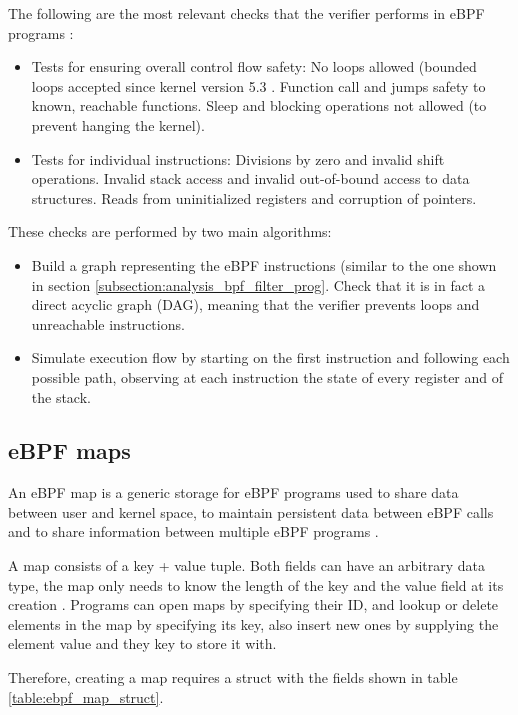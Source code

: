 The following are the most relevant checks that the verifier performs in eBPF programs \cite{ebpf_verifier_kerneldocs} \cite{ebpf_JIT_demystify_page17-22}:
\begin{itemize}
\item Tests for ensuring overall control flow safety:
	\subitem No loops allowed (bounded loops accepted since kernel version 5.3 \cite{ebpf_bounded_loops}.
	\subitem Function call and jumps safety to known, reachable functions.
	\subitem Sleep and blocking operations not allowed (to prevent hanging the kernel).
\item Tests for individual instructions:
	 \subitem Divisions by zero and invalid shift operations.
	 \subitem Invalid stack access and invalid out-of-bound access to data structures.
	 \subitem Reads from uninitialized registers and corruption of pointers.
\end{itemize}

These checks are performed by two main algorithms:
\begin{itemize}
\item Build a graph representing the eBPF instructions (similar to the one shown in section \ref{subsection:analysis_bpf_filter_prog}. Check that it is in fact a direct acyclic graph (DAG), meaning that the verifier prevents loops and unreachable instructions.
\item Simulate execution flow by starting on the first instruction and following each possible path, observing at each instruction the state of every register and of the stack.
\end{itemize}

\subsection{eBPF maps} \label{subsection:ebpf_maps}
An eBPF map is a generic storage for eBPF programs used to share data between user and kernel space, to maintain persistent data between eBPF calls and to share information between multiple eBPF programs \cite{ebpf_maps_kernel}.

A map consists of a key + value tuple. Both fields can have an arbitrary data type, the map only needs to know the length of the key and the value field at its creation \cite{bpf_syscall}. Programs can open maps by specifying their ID, and lookup or delete elements in the map by specifying its key, also insert new ones by supplying the element value and they key to store it with.

Therefore, creating a map requires a struct with the fields shown in table \ref{table:ebpf_map_struct}.


